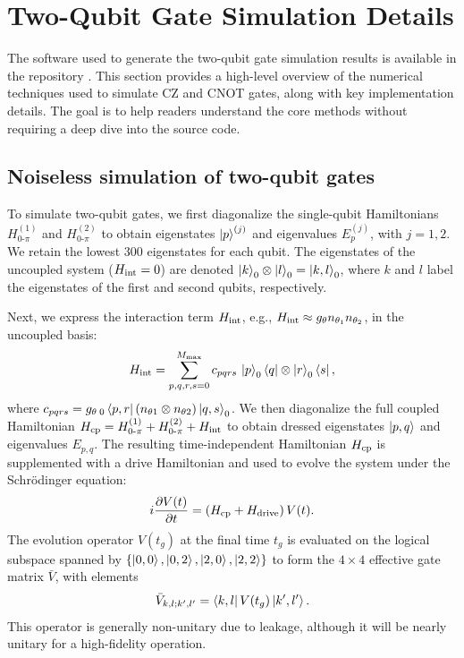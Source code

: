 \section{Two-Qubit Gate Simulation Details}\label{zp:sec:2Qgate_simulation}
The software used to generate the two-qubit gate simulation results is available in the repository \cite{zp2q_repo}.
This section provides a high-level overview of the numerical techniques used to simulate CZ and CNOT gates, along with key implementation details.
The goal is to help readers understand the core methods without requiring a deep dive into the source code.

\subsection{Noiseless simulation of two-qubit gates}
To simulate two-qubit gates, we first diagonalize the single-qubit Hamiltonians $H_{0\text{-}\pi}^{(1)}$ and $H_{0\text{-}\pi}^{(2)}$ to obtain eigenstates $\ket{p}^{(j)}$ and eigenvalues $E_p^{(j)}$, with $j = 1, 2$.
We retain the lowest 300 eigenstates for each qubit.
The eigenstates of the uncoupled system ($H_{\rm int} = 0$) are denoted $\ket{k}_0\otimes\ket{l}_0=\ket{k,l}_0$, where $k$ and $l$ label the eigenstates of the first and second qubits, respectively.

Next, we express the interaction term $H_{\rm int}$, e.g., $H_{\rm int}\approx  g_{\theta} n_{\theta_1}n_{\theta_2}$, in the uncoupled basis:
\begin{equation}
H_{\rm int} = \sum_{p,q,r,s=0}^{M_{\rm max}}
c_{pqrs}\, \ket{p}_0\bra{q} \otimes \ket{r}_0\bra{s},
\end{equation}
where $c_{pqrs} = g_\theta \,_0\bra{p,r} (n_{\theta 1}\otimes n_{\theta 2} )\ket{q,s}_0$.
We then diagonalize the full coupled Hamiltonian $H_{\rm cp} = H_{0\text{-}\pi}^{(1)} + H_{0\text{-}\pi}^{(2)} + H_{\rm int}$ to obtain dressed eigenstates $\ket{p, q}$ and eigenvalues $E_{p,q}$.
The resulting time-independent Hamiltonian $H_{\rm cp}$ is supplemented with a drive Hamiltonian and used to evolve the system under the Schr\"odinger equation:
\begin{equation}
i\frac{\partial V(t)}{\partial t} = \left( H_{\rm cp} + H_{\rm drive} \right) V(t).
\end{equation}
The evolution operator $V(t_g)$ at the final time $t_g$ is evaluated on the logical subspace spanned by $\{ \ket{0,0}, \ket{0,2}, \ket{2,0}, \ket{2,2} \}$ to form the $4 \times 4$ effective gate matrix $\bar V$, with elements
\begin{equation}
\bar V_{k,l;k',l'} = \bra{k,l} V(t_g) \ket{k',l'}.
\end{equation}
This operator is generally non-unitary due to leakage, although it will be nearly unitary for a high-fidelity operation.

